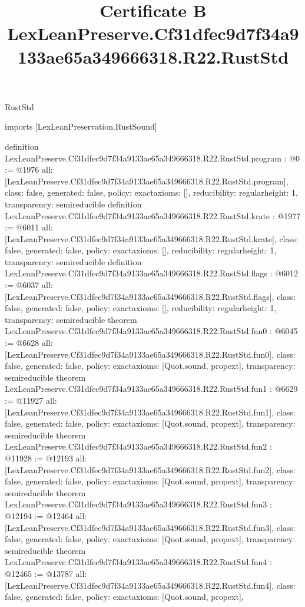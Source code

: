 \begin{lexlean}{RustStd}
\title{Certificate B LexLeanPreserve.Cf31dfec9d7f34a9133ae65a349666318.R22.RustStd}
\begin{coremodule}
imports [LexLeanPreservation.RustSound]

definition LexLeanPreserve.Cf31dfec9d7f34a9133ae65a349666318.R22.RustStd.program : @0 := @1976 {
  all: [LexLeanPreserve.Cf31dfec9d7f34a9133ae65a349666318.R22.RustStd.program],
  class: false,
  generated: false,
  policy: exact{axioms: []},
  reducibility: regular{height: 1},
  transparency: semireducible
}
definition LexLeanPreserve.Cf31dfec9d7f34a9133ae65a349666318.R22.RustStd.krate : @1977 := @6011 {
  all: [LexLeanPreserve.Cf31dfec9d7f34a9133ae65a349666318.R22.RustStd.krate],
  class: false,
  generated: false,
  policy: exact{axioms: []},
  reducibility: regular{height: 1},
  transparency: semireducible
}
definition LexLeanPreserve.Cf31dfec9d7f34a9133ae65a349666318.R22.RustStd.flags : @6012 := @6037 {
  all: [LexLeanPreserve.Cf31dfec9d7f34a9133ae65a349666318.R22.RustStd.flags],
  class: false,
  generated: false,
  policy: exact{axioms: []},
  reducibility: regular{height: 1},
  transparency: semireducible
}
theorem LexLeanPreserve.Cf31dfec9d7f34a9133ae65a349666318.R22.RustStd.fun0 : @6045 := @6628 {
  all: [LexLeanPreserve.Cf31dfec9d7f34a9133ae65a349666318.R22.RustStd.fun0],
  class: false,
  generated: false,
  policy: exact{axioms: [Quot.sound, propext]},
  transparency: semireducible
}
theorem LexLeanPreserve.Cf31dfec9d7f34a9133ae65a349666318.R22.RustStd.fun1 : @6629 := @11927 {
  all: [LexLeanPreserve.Cf31dfec9d7f34a9133ae65a349666318.R22.RustStd.fun1],
  class: false,
  generated: false,
  policy: exact{axioms: [Quot.sound, propext]},
  transparency: semireducible
}
theorem LexLeanPreserve.Cf31dfec9d7f34a9133ae65a349666318.R22.RustStd.fun2 : @11928 := @12193 {
  all: [LexLeanPreserve.Cf31dfec9d7f34a9133ae65a349666318.R22.RustStd.fun2],
  class: false,
  generated: false,
  policy: exact{axioms: [Quot.sound, propext]},
  transparency: semireducible
}
theorem LexLeanPreserve.Cf31dfec9d7f34a9133ae65a349666318.R22.RustStd.fun3 : @12194 := @12464 {
  all: [LexLeanPreserve.Cf31dfec9d7f34a9133ae65a349666318.R22.RustStd.fun3],
  class: false,
  generated: false,
  policy: exact{axioms: [Quot.sound, propext]},
  transparency: semireducible
}
theorem LexLeanPreserve.Cf31dfec9d7f34a9133ae65a349666318.R22.RustStd.fun4 : @12465 := @13787 {
  all: [LexLeanPreserve.Cf31dfec9d7f34a9133ae65a349666318.R22.RustStd.fun4],
  class: false,
  generated: false,
  policy: exact{axioms: [Quot.sound, propext]},
}
\end{coremodule}
\end{lexlean}
